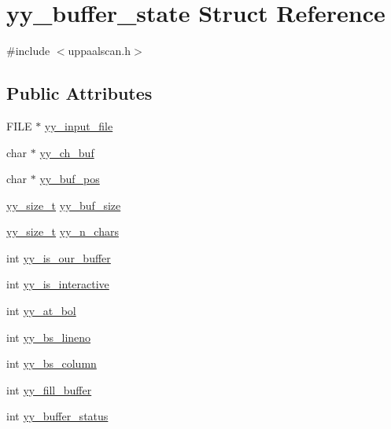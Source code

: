 \hypertarget{structyy__buffer__state}{}\section{yy\+\_\+buffer\+\_\+state Struct Reference}
\label{structyy__buffer__state}


{\ttfamily \#include $<$uppaalscan.\+h$>$}

\subsection*{Public Attributes}
\begin{DoxyCompactItemize}
\item 
F\+I\+LE $\ast$ \mbox{\hyperlink{structyy__buffer__state_a4843d1422e3276b636d475a3095bd948}{yy\+\_\+input\+\_\+file}}
\item 
char $\ast$ \mbox{\hyperlink{structyy__buffer__state_ad7b8df8d8a4688e57b0b8d3ca75adc85}{yy\+\_\+ch\+\_\+buf}}
\item 
char $\ast$ \mbox{\hyperlink{structyy__buffer__state_a58aa927f098b99d99e75da80f9b681ef}{yy\+\_\+buf\+\_\+pos}}
\item 
\mbox{\hyperlink{uppaalscan_8h_ad557845057f187eec4be07e2717d2afa}{yy\+\_\+size\+\_\+t}} \mbox{\hyperlink{structyy__buffer__state_a48302f5f3477a9c78bbddf56d356ef54}{yy\+\_\+buf\+\_\+size}}
\item 
\mbox{\hyperlink{uppaalscan_8h_ad557845057f187eec4be07e2717d2afa}{yy\+\_\+size\+\_\+t}} \mbox{\hyperlink{structyy__buffer__state_afcc44872643f513e79b43c2b1f334a67}{yy\+\_\+n\+\_\+chars}}
\item 
int \mbox{\hyperlink{structyy__buffer__state_a80ce2431c70dc4f89ced487f18449465}{yy\+\_\+is\+\_\+our\+\_\+buffer}}
\item 
int \mbox{\hyperlink{structyy__buffer__state_abf5c70eea75581b58c0ee7bd31b14490}{yy\+\_\+is\+\_\+interactive}}
\item 
int \mbox{\hyperlink{structyy__buffer__state_a9d60c60af6e1a6f69de16871fd64f85f}{yy\+\_\+at\+\_\+bol}}
\item 
int \mbox{\hyperlink{structyy__buffer__state_a818e94bc9c766e683c60df1e9fd01199}{yy\+\_\+bs\+\_\+lineno}}
\item 
int \mbox{\hyperlink{structyy__buffer__state_a10c4fcd8be759e6bf11e6d3e8cdb0307}{yy\+\_\+bs\+\_\+column}}
\item 
int \mbox{\hyperlink{structyy__buffer__state_a63d2afbb1d79a3fc63df9e12626f827d}{yy\+\_\+fill\+\_\+buffer}}
\item 
int \mbox{\hyperlink{structyy__buffer__state_a70fd925d37a2f0454fbd0def675d106c}{yy\+\_\+buffer\+\_\+status}}
\end{DoxyCompactItemize}


